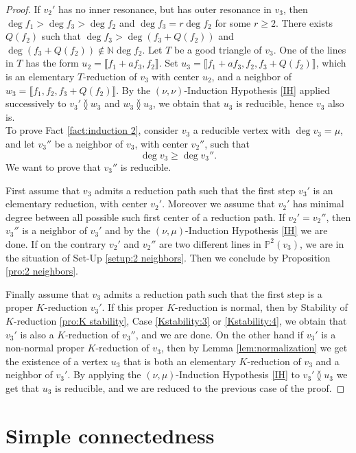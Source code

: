 \documentclass[reqno,oneside,11pt]{amsart}
\theoremstyle{plain}
\theoremstyle{definition}
\newcommand{\N}{\mathbb{N}}
\newcommand{\p}{\mathbb{P}}
\renewcommand{\ne}{\between}
\newcommand{\llb}{\llbracket}
\newcommand{\rrb}{\rrbracket}
\newcommand{\lines}[1]{\p^2(#1)}
\renewcommand{\ge}{\geqslant}
\begin{document}
\begin{proof}
If $v_2'$ has no inner resonance, but has outer resonance in $v_3$, then $\deg f_1 > \deg f_3 > \deg f_2$ and $\deg f_3 = r \deg f_2$ for some $r \ge 2$.
There exists $Q(f_2)$ such that $\deg f_3 > \deg (f_3 + Q(f_2))$ and $\deg (f_3 + Q(f_2)) \not \in \N\deg f_2$.
Let $T$ be a good triangle of $v_3$.
One of the lines in $T$ has the form $u_2 = \llb f_1 + af_3, f_2\rrb$.
Set $u_3 = \llb f_1 + af_3, f_2, f_3 + Q(f_2) \rrb$, which is an
elementary $T$-reduction of $v_3$ with center $u_2$, and a neighbor of $w_3 =
\llb f_1, f_2, f_3 + Q(f_2) \rrb$.
By the $(\nu,\nu)$-Induction Hypothesis \ref{IH} applied successively to $v_3' \ne w_3$ and $w_3 \ne u_3$, we obtain that $u_3$ is  reducible, hence $v_3$ also is.
\\

To prove Fact \ref{fact:induction 2}, consider $v_3$ a reducible vertex with $\deg v_3 = \mu$, and let $v_3''$ be a neighbor of $v_3$, with center $v_2''$, such that
$$\deg v_3 \ge \deg v_3''.$$
We want to prove that $v_3''$ is reducible.

First assume that $v_3$ admits a reduction path such that the first step $v_3'$ is an elementary reduction, with center $v_2'$.
Moreover we assume that $v_2'$ has minimal degree between all possible such first center of a reduction path.
If $v_2' = v_2''$, then $v_3''$ is a neighbor of $v_3'$ and by the $(\nu,\mu)$-Induction Hypothesis \ref{IH} we are done.
If on the contrary $v_2'$ and $v_2''$ are two different lines in $\lines{v_3}$, we are in the situation of Set-Up \ref{setup:2 neighbors}.
Then we conclude by Proposition \ref{pro:2 neighbors}.

Finally assume that $v_3$ admits a reduction path such that the first step is a proper $K$-reduction $v_3'$.
If this proper $K$-reduction is normal, then by Stability of $K$-reduction \ref{pro:K stability}, Case
\ref{Kstability:3} or \ref{Kstability:4}, we obtain that $v_3'$ is also a
$K$-reduction of $v_3''$, and we are done.
On the other hand if $v_3'$ is a non-normal proper $K$-reduction of $v_3$, then by Lemma \ref{lem:normalization} we get the existence of a vertex $u_3$ that is both an elementary $K$-reduction of $v_3$ and a neighbor of $v_3'$.
By applying the $(\nu,\mu)$-Induction Hypothesis \ref{IH} to $v_3' \ne u_3$ we get that $u_3$ is reducible, and we are reduced to the previous case of the proof.
\end{proof}

\section{Simple connectedness} \label{sec:1-connected}
\end{document}
